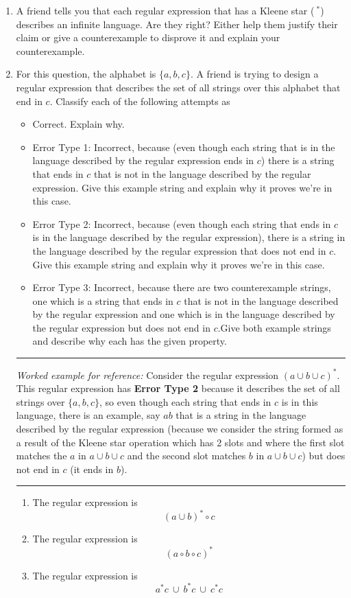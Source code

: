 \begin{enumerate}[wide, labelwidth=!, labelindent=0pt]
\begin{enumerate}
    \item\gradeComplete  A friend tells you that each regular expression that has a Kleene star ($~^*$) describes an
    infinite language. Are they right? Either help them justify their claim or give a counterexample to disprove it
    and explain your counterexample.

    \item\gradeCorrect For this question, the alphabet is $\{a,b,c\}$. A friend is trying to design a regular expression that describes the set of all strings over this alphabet that end in $c$. Classify each of the following attempts as 
    \begin{itemize}
    \item Correct. Explain why.
    \item Error Type 1: Incorrect, because (even though each string that is in the language described by the regular expression ends in $c$) there is a string that ends in $c$ that is not in the language described by the regular expression. Give this example string and explain why it proves we're in this case. 
    \item Error Type 2: Incorrect, because (even though each string that ends in $c$ is in the language described by the regular expression), there is a string in the language described by the regular expression that does not end in $c$. Give this example string and explain why it proves we're in this case. 
    \item Error Type 3: Incorrect, because there are two counterexample strings, one which is a string that ends in $c$ that is not in the language described by the regular expression and one which is in the language described by the regular expression but does not end in $c$.Give both example strings and describe why each has the given property.
    \end{itemize}

    \vfill
    \newpage

    \hrule
    {\it Worked example for reference:} Consider the regular expression $(a\cup b\cup c)^*$. This regular expression has {\bf Error Type 2} because it describes the set of all strings over $\{a,b,c\}$, so even though each string that ends in $c$ is in this language, there is an example, say $ab$ that is a string in the language described by the regular expression (because we consider the string formed as a result of the Kleene star operation which has 2 slots and where the first slot matches the $a$ in $a \cup b \cup c$ and the second slot matches $b$ in $a \cup b \cup c$) but does not end in $c$ (it ends in $b$).
    \hrule
    \begin{enumerate}
        \item The regular expression is   
        \[
        (a\cup b)^* \circ c
        \]
        \item The regular expression is  
        \[
        (a \circ b \circ c)^*
        \]
        \item The regular expression is  
        \[
        a^*c ~\cup~ b^*c ~\cup~ c^*c
        \]
    \end{enumerate}
    \end{enumerate}


\end{enumerate}

